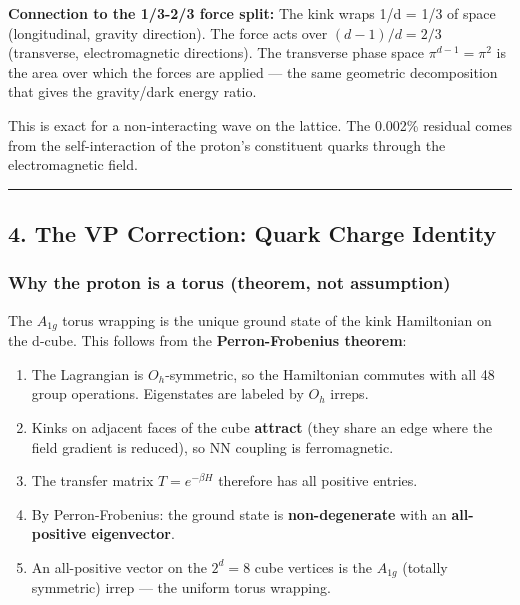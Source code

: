 \documentclass[
]{article}
\providecommand{\tightlist}{%
  \setlength{\itemsep}{0pt}\setlength{\parskip}{0pt}}
\begin{document}
\textbf{Connection to the 1/3-2/3 force split:} The kink wraps 1/d = 1/3
of space (longitudinal, gravity direction). The force acts over
\((d-1)/d = 2/3\) (transverse, electromagnetic directions). The
transverse phase space \(\pi^{d-1} = \pi^2\) is the area over which the
forces are applied --- the same geometric decomposition that gives the
gravity/dark energy ratio.

This is exact for a non-interacting wave on the lattice. The 0.002\%
residual comes from the self-interaction of the proton's constituent
quarks through the electromagnetic field.

\begin{center}\rule{0.5\linewidth}{0.5pt}\end{center}

\subsection{4. The VP Correction: Quark Charge
Identity}\label{the-vp-correction-quark-charge-identity}

\subsubsection{Why the proton is a torus (theorem, not
assumption)}\label{why-the-proton-is-a-torus-theorem-not-assumption}

The \(A_{1g}\) torus wrapping is the unique ground state of the kink
Hamiltonian on the d-cube. This follows from the
\textbf{Perron-Frobenius theorem}:

\begin{enumerate}
\def\labelenumi{\arabic{enumi}.}
\tightlist
\item
  The Lagrangian is \(O_h\)-symmetric, so the Hamiltonian commutes with
  all 48 group operations. Eigenstates are labeled by \(O_h\) irreps.
\item
  Kinks on adjacent faces of the cube \textbf{attract} (they share an
  edge where the field gradient is reduced), so NN coupling is
  ferromagnetic.
\item
  The transfer matrix \(T = e^{-\beta H}\) therefore has all positive
  entries.
\item
  By Perron-Frobenius: the ground state is \textbf{non-degenerate} with
  an \textbf{all-positive eigenvector}.
\item
  An all-positive vector on the \(2^d = 8\) cube vertices is the
  \(A_{1g}\) (totally symmetric) irrep --- the uniform torus wrapping.
\end{enumerate}
\end{document}
